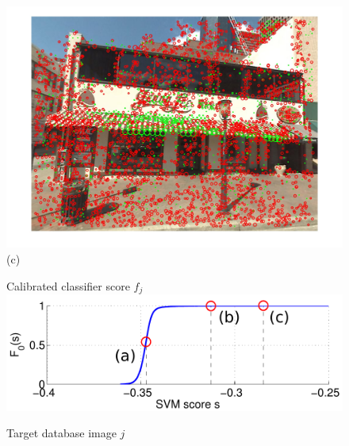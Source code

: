 \begin{figure}[]
\begin{minipage}{0.48\linewidth}
\begin{minipage}{\wii}
            \centering
            \includegraphics[width=\linewidth]{imgs/wVS3q/2882/cftrs.jpg}
            \newline
            (c)
          \end{minipage} 
    \end{minipage}%
    \begin{minipage}{0.04\linewidth}
      \hspace{\linewidth}
    \end{minipage}
    \begin{minipage}{0.48\linewidth}
          \begin{minipage}{0.66\linewidth}
            \centering
            {\scriptsize Calibrated classifier score $f_j$}
            \\
            \vspace{2mm}
            \includegraphics[width=\linewidth]{imgs/wVS3q/2932/graphBigO.pdf}
          \end{minipage} 
          \begin{minipage}{\wii}
            \centering
            \centerline{\scriptsize Target database image $j$}

\end{minipage}
\end{minipage}
\end{figure}

